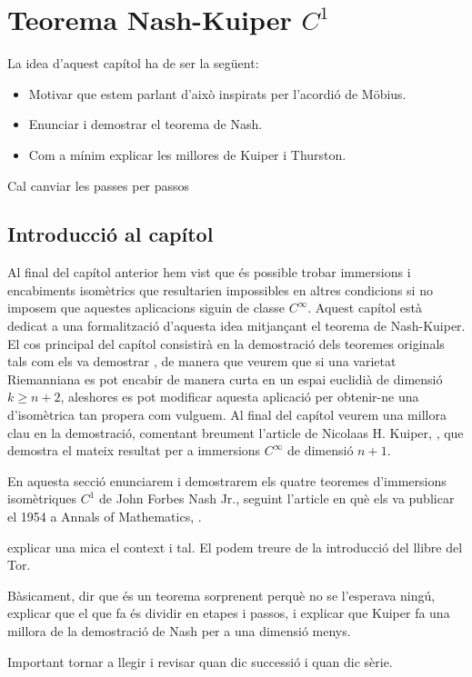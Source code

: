 \chapter{Teorema Nash-Kuiper $C^1$}\label{chap:capitol_nash}
{\color{blue} La idea d'aquest capítol ha de ser la següent:
\begin{itemize}
    \item Motivar que estem parlant d'això inspirats per l'acordió de Möbius.
    \item Enunciar i demostrar el teorema de Nash.
    \item Com a mínim explicar les millores de Kuiper i Thurston.
\end{itemize}
}

{\color{red}Cal canviar les passes per passos}



\section{Introducció al capítol}
Al final del capítol anterior hem vist que és possible trobar immersions i encabiments isomètrics que resultarien impossibles en altres condicions si no imposem que aquestes aplicacions siguin de classe $C^\infty$. Aquest capítol està dedicat a una formalització d'aquesta idea mitjançant el teorema de Nash-Kuiper. El cos principal del capítol consistirà en la demostració dels teoremes originals tals com els va demostrar \cite{nash1954}, de manera que veurem que si una varietat Riemanniana es pot encabir de manera curta en un espai euclidià de dimensió $k\ge n+2$, aleshores es pot modificar aquesta aplicació per obtenir-ne una d'isomètrica tan propera com vulguem. Al final del capítol veurem una millora clau en la demostració, comentant breument l'article de Nicolaas H. Kuiper, \cite{kuiper1955}, que demostra el mateix resultat per a immersions $C^\infty$ de dimensió $n+1$.

En aquesta secció enunciarem i demostrarem els quatre teoremes d'immersions isomètriques $C^1$ de John Forbes Nash Jr., seguint l'article en què els va publicar el 1954 a Annals of Mathematics, \cite{nash1954}.\\
{\color{blue} explicar una mica el context i tal. El podem treure de la introducció del llibre del Tor.

Bàsicament, dir que és un teorema sorprenent perquè no se l'esperava ningú, explicar que el que fa és dividir en etapes i passos, i explicar que Kuiper fa una millora de la demostració de Nash per a una dimensió menys.

Important tornar a llegir i revisar quan dic successió i quan dic sèrie.}

